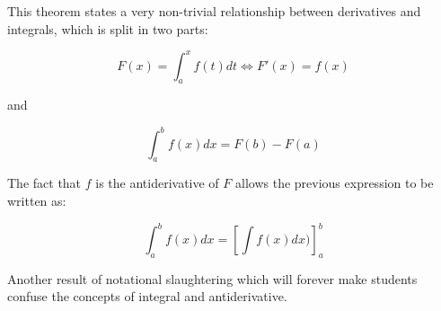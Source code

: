 This theorem states a very non-trivial relationship between derivatives and integrals, which is split in two parts:

$$F(x) = \int_a^x f(t) dt \iff F'(x) = f(x)$$

and

$$\int_a^b f(x) dx = F(b) - F(a)$$

The fact that $f$ is the antiderivative of $F$ allows the previous expression to be written as:

$$\int_a^b f(x) dx = \left[\int f(x) dx)\right]_{a}^{b}$$

Another result of notational slaughtering which will forever make students confuse the concepts of integral and antiderivative.

\newpage
